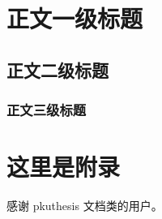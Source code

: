\documentclass{pkuthesis}
\begin{document}
\section{正文一级标题}
\subsection{正文二级标题}
\subsubsection{正文三级标题}
\printbibliography %

\appendix
\section{这里是附录}

\acknowledgments
感谢 pkuthesis 文档类的用户。
\end{document}
